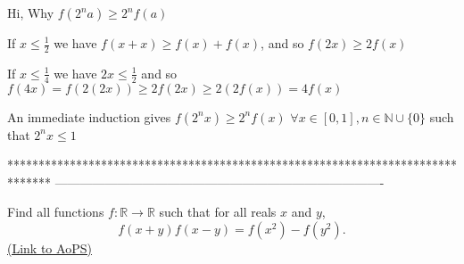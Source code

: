 \begin{solution}
	\begin{tcolorbox}Hi,
Why $ f(2^{n}a)\geq 2^{n}f(a)$\end{tcolorbox}

If $ x\leq\frac{1}{2}$ we have $ f(x+x)\geq f(x)+f(x)$, and so $ f(2x)\geq 2f(x)$

If $ x\leq\frac{1}{4}$ we have $ 2x\leq\frac{1}{2}$ and so $ f(4x)=f(2(2x))\geq 2f(2x) \geq 2(2f(x))=4f(x)$

An immediate induction gives $ f(2^nx)\geq 2^nf(x)$ $ \forall x\in[0,1],n\in\mathbb{N}\cup\{0\}$ such that $ 2^nx \leq 1$
\end{solution}
*******************************************************************************
-------------------------------------------------------------------------------

\begin{problem}
	Find all functions $ f: \mathbb{R}\rightarrow \mathbb{R}$ such that for all reals $x$ and $y$,
\[f(x+y)f(x-y)=f(x^2)-f(y^2).\]
	\flushright \href{https://artofproblemsolving.com/community/c6h273627}{(Link to AoPS)}
\end{problem}



